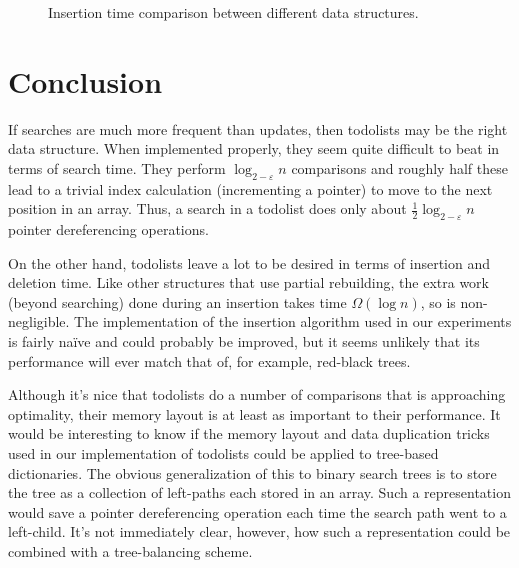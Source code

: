 \documentclass[lotsofwhite]{patmorin}
\newcommand{\eps}{\varepsilon}
\begin{document}
\begin{figure}
  \centering{}
  \caption{Insertion time comparison between different data structures.}
\end{figure}



\section{Conclusion}

If searches are much more frequent than updates, then todolists may
be the right data structure.  When implemented properly,
they seem quite difficult to beat in terms of search time.  They
perform $\log_{2-\eps} n$ comparisons and roughly half these lead to
a trivial index calculation (incrementing a pointer) to move to the
next position in an array. Thus, a search in a todolist does only about
$\frac{1}{2}\log_{2-\eps} n$ pointer dereferencing operations.

On the other hand, todolists leave a lot to be desired in terms of
insertion and deletion time.  Like other structures that use partial
rebuilding, the extra work (beyond searching) done during an insertion
takes time $\Omega(\log n)$, so is non-negligible.  The implementation
of the insertion algorithm used in our experiments is fairly naïve and
could probably be improved, but it seems unlikely that its performance
will ever match that of, for example, red-black trees.

Although it's nice that todolists do a number of comparisons that is
approaching optimality, their memory layout is at least as important to
their performance.  It would be interesting to know if the memory layout
and data duplication tricks used in our implementation of todolists could
be applied to tree-based dictionaries.  The obvious generalization of this
to binary search trees is to store the tree as a collection of left-paths
each stored in an array. Such a representation would save a pointer
dereferencing operation each time the search path went to a left-child.
It's not immediately clear, however, how such a representation could be
combined with a tree-balancing scheme.



\end{document}
